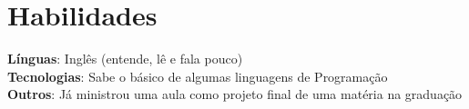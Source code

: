 \section{Habilidades}
    \begin{itemize}[leftmargin=0.15in, label={}]
	\small{\item{
		\textbf{Línguas}{: Inglês (entende, lê e fala pouco)} \\
		\textbf{Tecnologias}{: Sabe o básico de algumas linguagens de Programação} \\
		\textbf{Outros}{: Já ministrou uma aula como projeto final de uma matéria na graduação}
	}}
    \end{itemize}